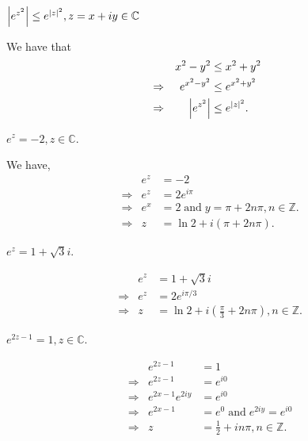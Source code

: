 \documentclass[12pt]{book}
\begin{document}
\begin{exmp}
    $\left\lvert e^{z^2} \right\rvert \leq e^{\left\lvert z \right\rvert^2}, z = x + iy \in \mathbb{C}$ 
\end{exmp}
We have that 
\begin{align*}
    &&x^2 - y^2 
        &\leq 
            x^2 + y^2 \\
    &\Rightarrow &e^{x^2 - y^2}
        &\leq
            e^{x^2 + y^2} \\
    &\Rightarrow &\left\lvert e^{z^{2}} \right\rvert
        &\leq
            e^{\left\lvert z \right\rvert^2}.
\end{align*}

\begin{exmp}
    $e^{z} = -2, z \in \mathbb{C}.$
\end{exmp}
We have,
\begin{align*}
    &&e^{z}
        &=
            -2 \\
    &\Rightarrow &e^{z}
        &=
            2e^{i\pi} \\
    &\Rightarrow &e^{x}
        &= 
            2\;
    \text{and}\;
    y
        =
            \pi + 2n\pi, n \in \mathbb{Z}. \\
    &\Rightarrow &z
        &= 
            \ln 2 + i(\pi + 2n\pi).
\end{align*}

\begin{exmp}
    $e^{z} = 1 + \sqrt{3}i.$
\end{exmp}
\begin{align*}
    &&e^{z}
        &=
            1 + \sqrt{3}i \\
    &\Rightarrow &e^{z}
        &=
            2e^{i\pi/3} \\
    &\Rightarrow &z
        &=
            \ln 2 + i\left(\frac{\pi}{3} + 2n\pi\right), n \in \mathbb{Z}.
\end{align*}

\begin{exmp}
    $e^{2z - 1} = 1, z \in \mathbb{C}.$
\end{exmp}
\begin{align*}
    &&e^{2z - 1}
        &=
            1 \\
    &\Rightarrow &e^{2z - 1}
        &=
            e^{i0} \\
    &\Rightarrow &e^{2x - 1}e^{2iy}
        &=
            e^{i0} \\
    &\Rightarrow &e^{2x - 1}
        &=
            e^{0}\;
    \text{and}\;
    e^{2iy}
        =
            e^{i0} \\
    &\Rightarrow &z
        &=
            \frac{1}{2} + in\pi, n \in \mathbb{Z}. 
\end{align*}
\end{document}
